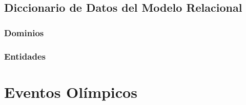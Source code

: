 \documentclass[12pt]{article}
\begin{document}
{\begin{landscape}
    \subsection{Diccionario de Datos del Modelo Relacional}
    
    \subsubsection{Dominios}
    \begin{center}
        
    \end{center}
    
    \subsubsection{Entidades}
    \begin{center}
        
    \end{center}
    
    \end{landscape}
}

\newpage
\section{Eventos Olímpicos}


\end{document}
